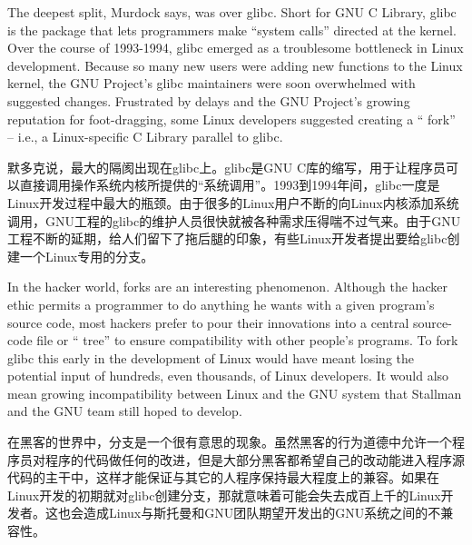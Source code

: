 
\ifdefined\eng
The deepest split, Murdock says, was over glibc. Short for GNU C Library, glibc is the package that lets programmers make ``system calls'' directed at the kernel. Over the course of 1993-1994, glibc emerged as a troublesome bottleneck in Linux development. Because so many new users were adding new functions to the Linux kernel, the GNU Project's glibc maintainers were soon overwhelmed with suggested changes. Frustrated by delays and the GNU Project's growing reputation for foot-dragging, some Linux developers suggested creating a `` fork'' -- i.e., a Linux-specific C Library parallel to glibc.
\fi

\ifdefined\chs
默多克说，最大的隔阂出现在glibc上。glibc是GNU C库的缩写，用于让程序员可以直接调用操作系统内核所提供的``系统调用''。1993到1994年间，glibc一度是Linux开发过程中最大的瓶颈。由于很多的Linux用户不断的向Linux内核添加系统调用，GNU工程的glibc的维护人员很快就被各种需求压得喘不过气来。由于GNU工程不断的延期，给人们留下了拖后腿的印象，有些Linux开发者提出要给glibc创建一个Linux专用的分支。
\fi

\ifdefined\eng
In the hacker world, forks are an interesting phenomenon. Although the hacker ethic permits a programmer to do anything he wants with a given program's source code, most hackers prefer to pour their innovations into a central source-code file or `` tree'' to ensure compatibility with other people's programs. To fork glibc this early in the development of Linux would have meant losing the potential input of hundreds, even thousands, of Linux developers. It would also mean growing incompatibility between Linux and the GNU system that Stallman and the GNU team still hoped to develop.
\fi

\ifdefined\chs
在黑客的世界中，分支是一个很有意思的现象。虽然黑客的行为道德中允许一个程序员对程序的代码做任何的改进，但是大部分黑客都希望自己的改动能进入程序源代码的主干中，这样才能保证与其它的人程序保持最大程度上的兼容。如果在Linux开发的初期就对glibc创建分支，那就意味着可能会失去成百上千的Linux开发者。这也会造成Linux与斯托曼和GNU团队期望开发出的GNU系统之间的不兼容性。
\fi

